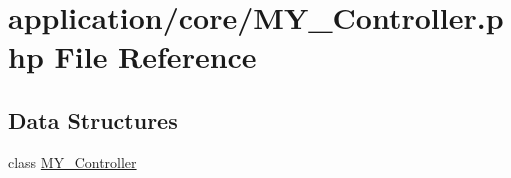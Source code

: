 \hypertarget{_m_y___controller_8php}{\section{application/core/\-M\-Y\-\_\-\-Controller.php File Reference}
\label{_m_y___controller_8php}
}
\subsection*{Data Structures}
\begin{DoxyCompactItemize}
\item 
class \hyperlink{class_m_y___controller}{M\-Y\-\_\-\-Controller}
\end{DoxyCompactItemize}
